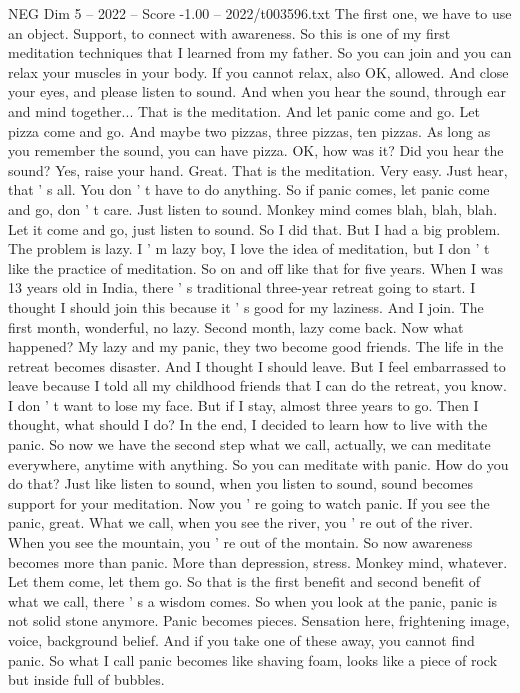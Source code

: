 \begin{textsample}{NEG Dim 5 – 2022 – Score -1.00 – 2022/t003596.txt}
The first one, we have to use an object.
Support, to connect with awareness.
So this is one of my first meditation techniques that I learned from my father.
So you can join and you can relax your muscles in your body.
If you cannot relax, also OK, allowed.
And close your eyes, and please listen to sound.
And when you hear the sound, through ear and mind together...
That is the meditation.
And let panic come and go.
Let pizza come and go.
And maybe two pizzas, three pizzas, ten pizzas.
As long as you remember the sound, you can have pizza.
OK, how was it?
Did you hear the sound?
Yes, raise your hand.
Great.
That is the meditation.
Very easy.
Just hear, that ' s all.
You don ' t have to do anything.
So if panic comes, let panic come and go, don ' t care.
Just listen to sound.
Monkey mind comes blah, blah, blah.
Let it come and go, just listen to sound.
So I did that.
But I had a big problem.
The problem is lazy.
I ' m lazy boy, I love the idea of meditation, but I don ' t like the practice of meditation.
So on and off like that for five years.
When I was 13 years old in India, there ' s traditional three-year retreat going to start.
I thought I should join this because it ' s good for my laziness.
And I join.
The first month, wonderful, no lazy.
Second month, lazy come back.
Now what happened?
My lazy and my panic, they two become good friends.
The life in the retreat becomes disaster.
And I thought I should leave.
But I feel embarrassed to leave because I told all my childhood friends that I can do the retreat, you know.
I don ' t want to lose my face.
But if I stay, almost three years to go.
Then I thought, what should I do?
In the end, I decided to learn how to live with the panic.
So now we have the second step what we call, actually, we can meditate everywhere, anytime with anything.
So you can meditate with panic.
How do you do that?
Just like listen to sound, when you listen to sound, sound becomes support for your meditation.
Now you ' re going to watch panic.
If you see the panic, great.
What we call, when you see the river, you ' re out of the river.
When you see the mountain, you ' re out of the montain.
So now awareness becomes more than panic.
More than depression, stress.
Monkey mind, whatever.
Let them come, let them go.
So that is the first benefit and second benefit of what we call, there ' s a wisdom comes.
So when you look at the panic, panic is not solid stone anymore.
Panic becomes pieces.
Sensation here, frightening image, voice, background belief.
And if you take one of these away, you cannot find panic.
So what I call panic becomes like shaving foam, looks like a piece of rock but inside full of bubbles.

\end{textsample}
